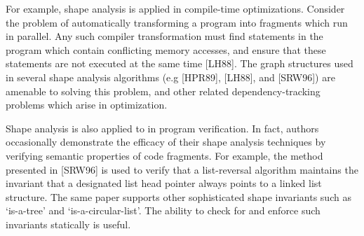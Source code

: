 \documentclass{article}
\begin{document}
For example, shape analysis is applied in compile-time optimizations.
Consider the problem of automatically transforming a program into fragments
which run in parallel. Any such compiler transformation must find
statements in the program which contain conflicting memory accesses, and
ensure that these statements are not executed at the same time [LH88]. The
graph structures used in several shape analysis algorithms (e.g [HPR89],
[LH88], and [SRW96]) are amenable to solving this problem, and other related
dependency-tracking problems which arise in optimization.

Shape analysis is also applied to in program verification. In fact, authors
occasionally demonstrate the efficacy of their shape analysis techniques by
verifying semantic properties of code fragments. For example, the method
presented in [SRW96] is used to verify that a list-reversal algorithm
maintains the invariant that a designated list head pointer always points to
a linked list structure. The same paper supports other sophisticated shape
invariants such as `is-a-tree' and `is-a-circular-list'. The ability to
check for and enforce such invariants statically is useful.
\end{document}
